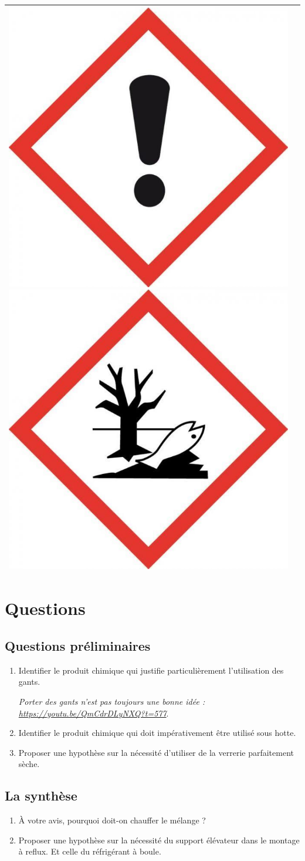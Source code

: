 \documentclass[12pt,a4paper,fleqn]{article}
\begin{document}
\begin{doc}
\begin{center}
\begin{tabular}[c]{|l| m{5.5cm} |}
\includegraphics[trim=0 0 0 -75, height=40 pt]{images/pict_nocif.jpg} \includegraphics[trim=0 0 0 -75, height=40 pt]{images/pict_aquatique.jpg}  \\
\hline
\end{tabular}
\end{center}
\end{doc}

\section*{Questions}

\subsection*{Questions préliminaires}

\begin{enumerate}
\item \app

Identifier le produit chimique qui justifie particulièrement l'utilisation des gants.

\emph{Porter des gants n'est pas toujours une bonne idée : \href{https://youtu.be/QmCdrDLyNXQ?t=577}{https://youtu.be/QmCdrDLyNXQ?t=577}}.

\item \app

Identifier le produit chimique qui doit impérativement être utilisé sous hotte.

\item \anarai

Proposer une hypothèse sur la nécessité d'utiliser de la verrerie parfaitement sèche.
\end{enumerate}

\subsection*{La synthèse}

\begin{enumerate}[resume]
\item \anarai

À votre avis, pourquoi doit-on chauffer le mélange ?

\item \anarai

Proposer une hypothèse sur la nécessité du support élévateur dans le montage à reflux.
Et celle du réfrigérant à boule.
\end{enumerate}
\end{document}
